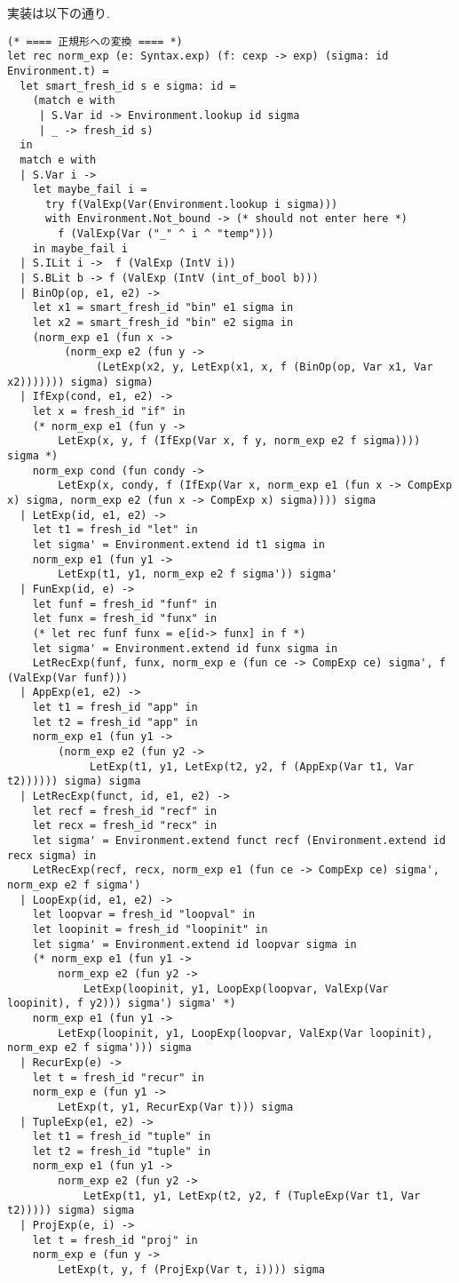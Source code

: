 実装は以下の通り.

\begin{lstlisting}[caption=normal.mlの実装]
(* ==== 正規形への変換 ==== *)
let rec norm_exp (e: Syntax.exp) (f: cexp -> exp) (sigma: id Environment.t) = 
  let smart_fresh_id s e sigma: id = 
    (match e with
     | S.Var id -> Environment.lookup id sigma
     | _ -> fresh_id s)
  in
  match e with
  | S.Var i -> 
    let maybe_fail i = 
      try f(ValExp(Var(Environment.lookup i sigma)))
      with Environment.Not_bound -> (* should not enter here *)
        f (ValExp(Var ("_" ^ i ^ "temp"))) 
    in maybe_fail i 
  | S.ILit i ->  f (ValExp (IntV i))
  | S.BLit b -> f (ValExp (IntV (int_of_bool b)))
  | BinOp(op, e1, e2) -> 
    let x1 = smart_fresh_id "bin" e1 sigma in
    let x2 = smart_fresh_id "bin" e2 sigma in
    (norm_exp e1 (fun x ->
         (norm_exp e2 (fun y ->
              (LetExp(x2, y, LetExp(x1, x, f (BinOp(op, Var x1, Var x2))))))) sigma) sigma)
  | IfExp(cond, e1, e2) -> 
    let x = fresh_id "if" in
    (* norm_exp e1 (fun y ->
        LetExp(x, y, f (IfExp(Var x, f y, norm_exp e2 f sigma)))) sigma *)
    norm_exp cond (fun condy -> 
        LetExp(x, condy, f (IfExp(Var x, norm_exp e1 (fun x -> CompExp x) sigma, norm_exp e2 (fun x -> CompExp x) sigma)))) sigma
  | LetExp(id, e1, e2) -> 
    let t1 = fresh_id "let" in
    let sigma' = Environment.extend id t1 sigma in
    norm_exp e1 (fun y1 ->
        LetExp(t1, y1, norm_exp e2 f sigma')) sigma'
  | FunExp(id, e) -> 
    let funf = fresh_id "funf" in
    let funx = fresh_id "funx" in
    (* let rec funf funx = e[id-> funx] in f *)
    let sigma' = Environment.extend id funx sigma in
    LetRecExp(funf, funx, norm_exp e (fun ce -> CompExp ce) sigma', f (ValExp(Var funf)))
  | AppExp(e1, e2) -> 
    let t1 = fresh_id "app" in
    let t2 = fresh_id "app" in
    norm_exp e1 (fun y1 -> 
        (norm_exp e2 (fun y2 -> 
             LetExp(t1, y1, LetExp(t2, y2, f (AppExp(Var t1, Var t2)))))) sigma) sigma
  | LetRecExp(funct, id, e1, e2) -> 
    let recf = fresh_id "recf" in
    let recx = fresh_id "recx" in
    let sigma' = Environment.extend funct recf (Environment.extend id recx sigma) in
    LetRecExp(recf, recx, norm_exp e1 (fun ce -> CompExp ce) sigma', norm_exp e2 f sigma')
  | LoopExp(id, e1, e2) -> 
    let loopvar = fresh_id "loopval" in
    let loopinit = fresh_id "loopinit" in
    let sigma' = Environment.extend id loopvar sigma in
    (* norm_exp e1 (fun y1 -> 
        norm_exp e2 (fun y2 -> 
            LetExp(loopinit, y1, LoopExp(loopvar, ValExp(Var loopinit), f y2))) sigma') sigma' *)
    norm_exp e1 (fun y1 -> 
        LetExp(loopinit, y1, LoopExp(loopvar, ValExp(Var loopinit), norm_exp e2 f sigma'))) sigma
  | RecurExp(e) -> 
    let t = fresh_id "recur" in
    norm_exp e (fun y1 -> 
        LetExp(t, y1, RecurExp(Var t))) sigma
  | TupleExp(e1, e2) -> 
    let t1 = fresh_id "tuple" in
    let t2 = fresh_id "tuple" in
    norm_exp e1 (fun y1 -> 
        norm_exp e2 (fun y2 -> 
            LetExp(t1, y1, LetExp(t2, y2, f (TupleExp(Var t1, Var t2))))) sigma) sigma
  | ProjExp(e, i) ->
    let t = fresh_id "proj" in
    norm_exp e (fun y -> 
        LetExp(t, y, f (ProjExp(Var t, i)))) sigma


\end{lstlisting}
